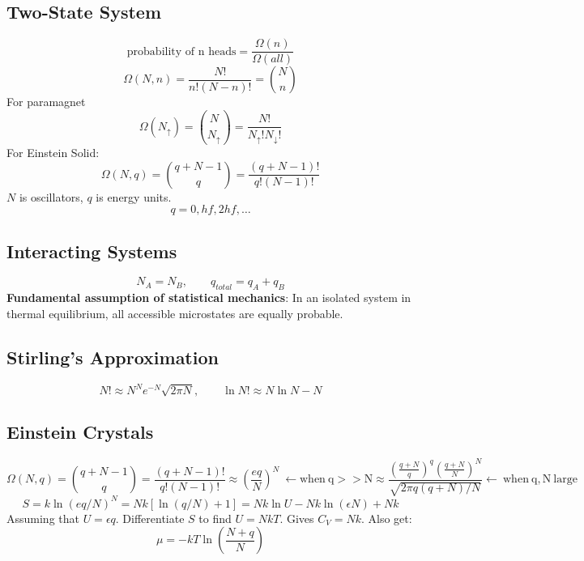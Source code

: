 \documentclass[a4paper,norsk, 10pt]{article}
\begin{document}
\subsection{Two-State System}
\begin{equation}
\text{probability of n heads} = \frac{\Omega(n)}{\Omega(all)}
\end{equation}
\begin{equation}
\Omega(N,n) = \frac{N!}{n!(N-n)!} = \binom{N}{n}
\end{equation}
For paramagnet
\begin{equation}
\Omega(N_{\uparrow}) = \binom{N}{N_{\uparrow}} = \frac{N!}{N_\uparrow ! N_\downarrow !}
\end{equation}
For Einstein Solid:
\begin{equation}
\Omega(N,q) = \binom{q+N-1}{q}=\frac{(q+N-1)!}{q!(N-1)!}
\end{equation}
$N$ is oscillators, $q$ is energy units.
\begin{equation}
q = 0, hf, 2hf, \ldots
\end{equation}

\subsection{Interacting Systems}
\begin{equation}
N_A = N_B, \qquad q_{total} = q_A + q_B
\end{equation}
\textbf{Fundamental assumption of statistical mechanics}: In an isolated system in thermal equilibrium, all accessible microstates are equally probable.

\subsection{Stirling's Approximation}
\begin{equation}
N!\approx N^Ne^{-N}\sqrt{2\pi N},\qquad \ln N! \approx N\ln N - N
\end{equation}
\subsection{Einstein Crystals}
\begin{equation}
\Omega(N,q)={q+N-1\choose q}=\frac{(q+N-1)!}{q!(N-1)!}\approx \left(\frac{eq}{N}\right)^N\ \leftarrow \mathrm{when\ q>>N} \approx \frac{\left(\frac{q+N}{q}\right)^q\left(\frac{q+N}{N}\right)^N}{\sqrt{2\pi q(q+N)/N}} \leftarrow\ \mathrm{when\ q,N\ large}
\end{equation}
\begin{equation}
S=k\ln (eq/N)^N=Nk[\ln(q/N)+1]=Nk\ln U-Nk\ln(\epsilon N)+Nk
\end{equation}
Assuming that $U=\epsilon q$. Differentiate $S$ to find $U=NkT$. Gives $C_V=Nk$. Also get:
\begin{equation}
\mu = -kT\ln \left(\frac{N+q}{N}\right)
\end{equation}
\end{document}
